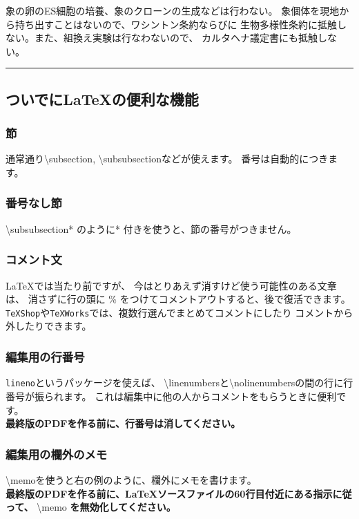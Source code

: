 \documentclass[11pt,a4j,dvipdfmx]{jarticle} 					%
\newcommand{\研究課題名}{象の卵}
\newcommand{\研究機関名}{逢坂大学}
\newcommand{\研究代表者氏名}{湯川秀樹}
\newcommand{\memo}[1]{\marginpar{#1}}
\begin{document}
	象の卵のES細胞の培養、象のクローンの生成などは行わない。
	象個体を現地から持ち出すことはないので、ワシントン条約ならびに
        生物多様性条約に抵触しない。また、組換え実験は行なわないので、
        カルタヘナ議定書にも抵触しない。

        \noindent
        \rule{\linewidth}{1pt}
        \linenumbers
        \subsection{ついでに\LaTeX の便利な機能}
        \subsubsection{節}
        通常通り\textbackslash subsection, \textbackslash subsubsectionなどが使えます。
        番号は自動的につきます。
        
        \subsubsection*{番号なし節}
        \textbackslash subsubsection* のように* 付きを使うと、節の番号がつきません。
        
        \subsubsection{コメント文}
        \LaTeX では当たり前ですが、
        今はとりあえず消すけど使う可能性のある文章は、
        消さずに行の頭に \% をつけてコメントアウトすると、後で復活できます。
        \texttt{TeXShop}や\texttt{TeXWorks}では、複数行選んでまとめてコメントにしたり
        コメントから外したりできます。
        
        \subsubsection{編集用の行番号}
        \texttt{lineno}というパッケージを使えば、
        \textbackslash linenumbersと\textbackslash nolinenumbersの間の行に行番号が振られます。
        これは編集中に他の人からコメントをもらうときに便利です。\\
        \textbf{最終版のPDFを作る前に、行番号は消してください。}
        
        \subsubsection{編集用の欄外のメモ}
        \textbackslash memo{}を使うと右の例のように、欄外にメモを書けます。\\
        \memo{欄外メモ\\だよ}
        \textbf{最終版のPDFを作る前に、\LaTeX ソースファイルの60行目付近にある指示に従って、}
        \textbackslash memo \textbf{を無効化してください。}
        
\end{document}
